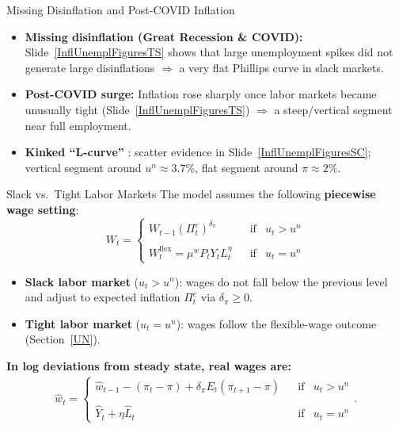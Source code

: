 \documentclass[11pt,aspectratio=169]{beamer}
\begin{document}
\begin{frame}{Missing Disinflation and Post-COVID Inflation}
\small
\begin{itemize}
  \item \textbf{Missing disinflation (Great Recession \& COVID):} Slide~\ref{InflUnemplFiguresTS} shows that large unemployment spikes did not generate large disinflations \(\Rightarrow\) a very flat Phillips curve in slack markets.
  \vspace{1em}
  \item \textbf{Post-COVID surge:} Inflation rose sharply once labor markets became unusually tight (Slide~\ref{InflUnemplFiguresTS}) \(\Rightarrow\) a steep/vertical segment near full employment.
  \vspace{1em}
  \item \textbf{Kinked \enquote{L-curve}} \parencite{BenignoEggertsson2023}: scatter evidence in Slide~\ref{InflUnemplFiguresSC}; vertical segment around \(u^{n}\approx 3.7\%\), flat segment around \(\pi \approx 2\%\).
\end{itemize}
\end{frame}

\begin{frame}{Slack vs.\ Tight Labor Markets}
\small
The model assumes the following \textbf{piecewise wage setting}:
\[
W_{t}=\left\{
\begin{array}{cccc}
W_{t-1}(\Pi _{t}^{e})^{\delta _{\pi }} &  & \text{if} & u_{t}>u^{n} \\
\\
W_{t}^{\mathrm{flex}}=\mu ^{w}P_{t}Y_{t}L_{t}^{\eta } &  & \text{if} & u_{t}=u^{n}
\end{array}
\right.
\]
\begin{itemize}
    \item \textbf{Slack labor market} (\(u_t>u^n\)): wages do not fall below the previous level and adjust to expected inflation \(\Pi_t^e\) via \(\delta_\pi\ge 0\).
    \item \textbf{Tight labor market} (\(u_t=u^n\)): wages follow the flexible-wage outcome (Section~\ref{UN}).
\end{itemize}

\textbf{In log deviations from steady state, real wages are:}
\begin{align}
\hat{w}_{t}=\left\{
\begin{array}{cccc}
\hat{w}_{t-1}-(\pi _{t}-\pi )+\delta _{\pi }E_{t}(\pi _{t+1}-\pi ) &  &
\text{if} & u_{t}>u^{n} \\
\\
\hat{Y}_{t}+\eta \hat{L}_{t} &  & \text{if} & u_{t}=u^{n}
\end{array}
\right. .
\label{eq19}
\end{align}
\end{frame}
\end{document}
